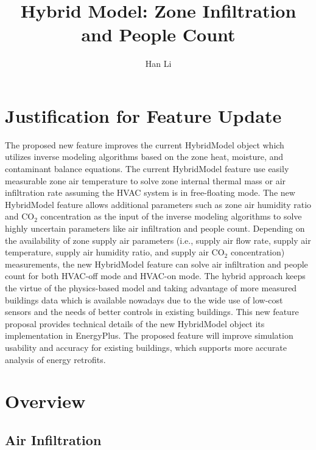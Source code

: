 \documentclass[11pt]{article}
\begin{document}
\title{Hybrid Model: Zone Infiltration and People Count}
\author{Han Li}

\maketitle


\section{Justification for Feature Update}
The proposed new feature improves the current HybridModel object which utilizes inverse modeling algorithms based on the zone heat, moisture, and contaminant balance equations. The current HybridModel feature use easily measurable zone air temperature to solve zone internal thermal mass or air infiltration rate assuming the HVAC system is in free-floating mode. The new HybridModel feature allows additional parameters such as zone air humidity ratio and CO$_2$ concentration as the input of the inverse modeling algorithms to solve highly uncertain parameters like air infiltration and people count. Depending on the availability of zone supply air parameters (i.e., supply air flow rate, supply air temperature, supply air humidity ratio, and supply air CO$_2$ concentration) measurements, the new HybridModel feature can solve air infiltration and people count for both HVAC-off mode and HVAC-on mode. The hybrid approach keeps the virtue of the physics-based model and taking advantage of more measured buildings data which is available nowadays due to the wide use of low-cost sensors and the needs of better controls in existing buildings.
This new feature proposal provides technical details of the new HybridModel object its implementation in EnergyPlus. The proposed feature will improve simulation usability and accuracy for existing buildings, which supports more accurate analysis of energy retrofits.

\section{Overview}
\subsection{Air Infiltration}
\end{document}
